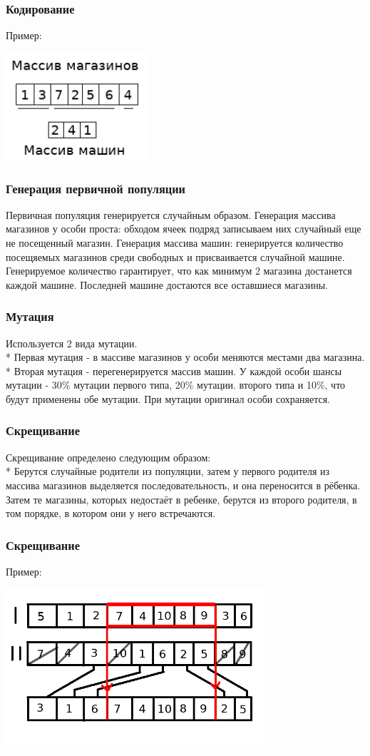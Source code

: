 \documentclass{beamer}
\begin{document}
\begin{frame}
    \frametitle{Кодирование}
    Пример:
    \begin{center}
        \includegraphics[height=4cm]{encoding.png}
    \end{center}
\end{frame}
\begin{frame}
    \frametitle{Генерация первичной популяции}
    Первичная популяция генерируется случайным образом.
    Генерация массива магазинов у особи проста: обходом ячеек подряд
    записываем них случайный еще не посещенный магазин.
    Генерация массива машин: генерируется количество посещяемых
    магазинов среди свободных и присваивается случайной машине.
    Генерируемое количество гарантирует, что как минимум 2 магазина
    достанется каждой машине. Последней машине достаются все оставшиеся
    магазины.
\end{frame}
\begin{frame}
    \frametitle{Мутация}
    Используется 2 вида мутации.\\*
    Первая мутация - в массиве магазинов у особи меняются местами два магазина.\\*
    Вторая мутация - перегенерируется массив машин.
    У каждой особи шансы мутации - 30\% мутации первого типа, 20\% мутации. второго типа и 10\%, что будут применены обе мутации. При мутации 
    оригинал особи сохраняется.
\end{frame}
\begin{frame}
    \frametitle{Скрещивание}
    Скрещивание определено следующим образом:\\*
    Берутся случайные родители из популяции, затем у первого родителя
    из массива магазинов выделяется последовательность, и она
    переносится в рёбенка. Затем те магазины, которых недостаёт в 
    ребенке, берутся из второго родителя, в том порядке, в котором они у 
    него встречаются.
\end{frame}
\begin{frame}
    \frametitle{Скрещивание}
    Пример:
    
    \begin{center}
        \includegraphics[height=6cm]{crossover.png}
    \end{center}
\end{frame}
\end{document}
